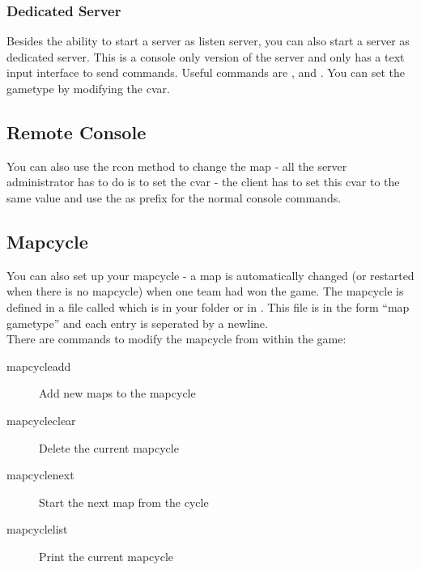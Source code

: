 \subsubsection{Dedicated Server}
Besides the ability to start a server as listen server, you can also start a server as dedicated server. This is a console only version of the server and only has a text input interface to send commands. Useful commands are ,  and . You can set the gametype by modifying the  cvar.

\subsection{Remote Console}
You can also use the rcon method to change the map - all the server administrator has to do is to set the cvar  - the client has to set this cvar to the same value and use the  as prefix for the normal console commands.

\subsection{Mapcycle}
You can also set up your mapcycle - a map is automatically changed (or restarted when there is no mapcycle) when one team had won the game. The mapcycle is defined in a file called  which is in your  folder or in . This file is in the form ``map gametype'' and each entry is seperated by a newline.\\
There are commands to modify the mapcycle from within the game:
\begin{description}
\item[mapcycleadd] Add new maps to the mapcycle
\item[mapcycleclear] Delete the current mapcycle
\item[mapcyclenext] Start the next map from the cycle
\item[mapcyclelist] Print the current mapcycle
\end{description}
